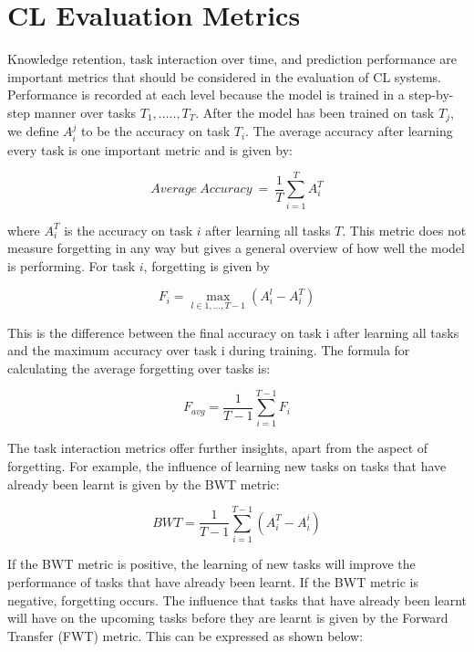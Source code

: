 \documentclass[english, LaM, oneside]{sapthesis}%
\numberwithin{equation}{chapter}
\begin{document}
\section{CL Evaluation Metrics}
Knowledge retention, task interaction over time, and prediction performance are important metrics that should be considered in the evaluation of CL systems. Performance is recorded at each level because the model is trained in a step-by-step manner over tasks $T_1,\ldots..,T_T$. After the model has been trained on task $T_j$, we define $A_i^j$ to be the accuracy on task $T_i$.
The average accuracy\cite{20} after learning every task is one important metric and is given by:

\begin{equation}
    Average\ Accuracy\ =\ \frac{1}{T}\sum_{i=1}^{T}A_i^T
\end{equation}

where $A_i^T$ is the accuracy on task $i$ after learning all tasks $T$. This metric does not measure forgetting in any way but gives a general overview of how well the model is performing.
For task $i$, forgetting is given by

\begin{equation}
    F_i = \max_{l\in{1,\ldots,T-1}} \left(A_i^l- A_i^T\right)
\end{equation}

This is the difference between the final accuracy on task i after learning all tasks and the maximum accuracy over task i during training.
The formula for calculating the average forgetting\cite{20} over tasks is: 

\begin{equation}
    F_{avg}=\frac{1}{T-1}\sum_{i=1}^{T-1}F_i
\end{equation}

The task interaction metrics offer further insights, apart from the aspect of forgetting. For example, the influence of learning new tasks on tasks that have already been learnt is given by the BWT\cite{20} metric: 

\begin{equation}
    BWT=\frac{1}{T-1}\sum_{i=1}^{T-1}\left(A_i^T-A_i^i\right)
\end{equation}

If the BWT metric is positive, the learning of new tasks will improve the performance of tasks that have already been learnt. If the BWT metric is negative, forgetting occurs.
The influence that tasks that have already been learnt will have on the upcoming tasks before they are learnt is given by the Forward Transfer (FWT)\cite{20} metric. This can be expressed as shown below:
\end{document}
